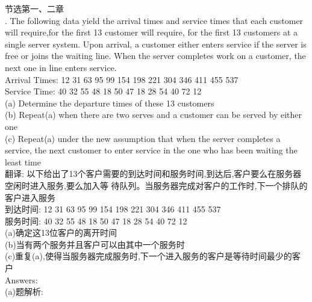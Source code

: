 \documentclass{book}
\begin{document}
\centering
节选第一、二章 \\

\justifying
{}. The following data yield the arrival times and service times that
each customer will require,for the first 13 customer will require,
for the first 13 customers at a single server system. Upon arrival,
a customer either enters service if the server is free or joins
the waiting line. When the server completes work on a customer,
the next one in line enters service. \\
\noindent
Arrival Times: 12 31 63 95 99 154 198 221 304 346 411 455 537 \\
Service Time: 40 32 55 48 18 50 47 18 28 54 40 72 12 \\
\indent
(a) Determine the departure times of these 13 customers  \\
\indent
(b) Repeat(a) when there are two serves and a customer can be served by either one \\
\indent
(c) Repeat(a) under the new assumption that when the server completes a service,
the next customer to enter service in the one who has been waiting the least time \\
\noindent
翻译:
以下给出了13个客户需要的到达时间和服务时间,到达后,客户要么在服务器空闲时进入服务,要么加入等
待队列。当服务器完成对客户的工作时,下一个排队的客户进入服务 \\
到达时间: 12 31 63 95 99 154 198 221 304 346 411 455 537 \\
服务时间: 40 32 55 48 18 50 47 18 28 54 40 72 12 \\
\indent
(a)确定这13位客户的离开时间 \\
\indent
(b)当有两个服务并且客户可以由其中一个服务时 \\
\indent
(c)重复(a),使得当服务器完成服务时,下一个进入服务的客户是等待时间最少的客户 \\
\noindent
Answers: \\
(a)题解析:
\end{document}
